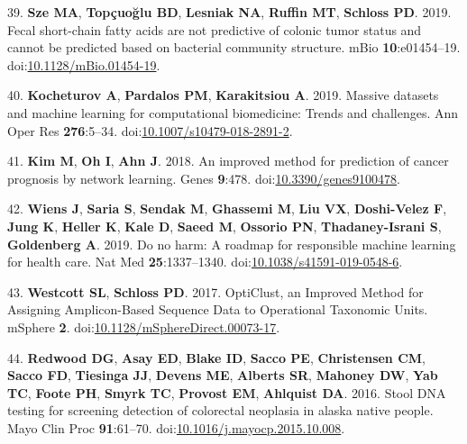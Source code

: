 \documentclass[
  11pt,
]{article}
\begin{document}
\leavevmode\hypertarget{ref-sze_fecal_2019}{}%
39. \textbf{Sze MA}, \textbf{Topçuoğlu BD}, \textbf{Lesniak NA},
\textbf{Ruffin MT}, \textbf{Schloss PD}. 2019. Fecal short-chain fatty
acids are not predictive of colonic tumor status and cannot be predicted
based on bacterial community structure. mBio \textbf{10}:e01454--19.
doi:\href{https://doi.org/10.1128/mBio.01454-19}{10.1128/mBio.01454-19}.

\leavevmode\hypertarget{ref-kocheturov_massive_2019}{}%
40. \textbf{Kocheturov A}, \textbf{Pardalos PM}, \textbf{Karakitsiou A}.
2019. Massive datasets and machine learning for computational
biomedicine: Trends and challenges. Ann Oper Res \textbf{276}:5--34.
doi:\href{https://doi.org/10.1007/s10479-018-2891-2}{10.1007/s10479-018-2891-2}.

\leavevmode\hypertarget{ref-kim_improved_2018}{}%
41. \textbf{Kim M}, \textbf{Oh I}, \textbf{Ahn J}. 2018. An improved
method for prediction of cancer prognosis by network learning. Genes
\textbf{9}:478.
doi:\href{https://doi.org/10.3390/genes9100478}{10.3390/genes9100478}.

\leavevmode\hypertarget{ref-wiens_no_2019}{}%
42. \textbf{Wiens J}, \textbf{Saria S}, \textbf{Sendak M},
\textbf{Ghassemi M}, \textbf{Liu VX}, \textbf{Doshi-Velez F},
\textbf{Jung K}, \textbf{Heller K}, \textbf{Kale D}, \textbf{Saeed M},
\textbf{Ossorio PN}, \textbf{Thadaney-Israni S}, \textbf{Goldenberg A}.
2019. Do no harm: A roadmap for responsible machine learning for health
care. Nat Med \textbf{25}:1337--1340.
doi:\href{https://doi.org/10.1038/s41591-019-0548-6}{10.1038/s41591-019-0548-6}.

\leavevmode\hypertarget{ref-westcott_opticlust_2017}{}%
43. \textbf{Westcott SL}, \textbf{Schloss PD}. 2017. OptiClust, an
Improved Method for Assigning Amplicon-Based Sequence Data to
Operational Taxonomic Units. mSphere \textbf{2}.
doi:\href{https://doi.org/10.1128/mSphereDirect.00073-17}{10.1128/mSphereDirect.00073-17}.

\leavevmode\hypertarget{ref-redwood_stool_2016}{}%
44. \textbf{Redwood DG}, \textbf{Asay ED}, \textbf{Blake ID},
\textbf{Sacco PE}, \textbf{Christensen CM}, \textbf{Sacco FD},
\textbf{Tiesinga JJ}, \textbf{Devens ME}, \textbf{Alberts SR},
\textbf{Mahoney DW}, \textbf{Yab TC}, \textbf{Foote PH}, \textbf{Smyrk
TC}, \textbf{Provost EM}, \textbf{Ahlquist DA}. 2016. Stool DNA testing
for screening detection of colorectal neoplasia in alaska native people.
Mayo Clin Proc \textbf{91}:61--70.
doi:\href{https://doi.org/10.1016/j.mayocp.2015.10.008}{10.1016/j.mayocp.2015.10.008}.
\end{document}
